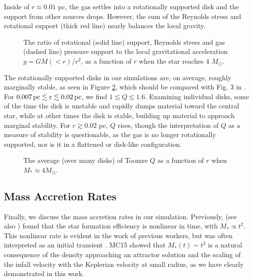 \documentclass[../dissertation.tex]{subfiles}
\begin{document}
Inside of $r\approx 0.01$ pc, the gas settles into a rotationally supported 
disk and the support from other sources drops. However,  
the sum of the Reynolds stress and rotational support (thick red line) nearly balances 
the local gravity. 

\begin{figure}[htb]%
\caption[Hydro Ratio of Pressure and Gravity]{The ratio of rotational (solid line) support, Reynolds stress and gas 
(dashed line) pressure support to the local gravitational acceleration 
$g = GM(<r)/r^2$, as a function of $r$ when the star reaches 4 
$M_{\odot}$. \label{fig:hydro_dPdr_avg}}
\end{figure}

The rotationally supported disks in our simulations are, on average, 
roughly marginally stable,  
as seen in Figure \ref{fig:hydro_Q_avg}, which should be compared with Fig. 3 in \citet{2010ApJ...708.1585K}.  For $0.007\,\rm pc\lesssim r \lesssim 0.02\,\rm pc$, 
we find  $1\lesssim Q\lesssim 1.6$. Examining individual disks, some of 
the time the disk is unstable and rapidly dumps material toward the central 
star, while at other times the disk is stable, building up material to approach marginal stability. For $r\gtrsim 0.02$ pc,  $Q$  rises, though the interpretation of 
$Q$ as a measure of stability is questionable, as the gas is no longer 
rotationally supported, nor is it in a flattened or disk-like configuration. 

\begin{figure}[htb]%
\caption[Hydro Toomre Q average]{The average (over many disks) of Toomre $Q$ as a function of $r$ when  $M_*\approx 4M_{\odot}$. \label{fig:hydro_Q_avg}}
\end{figure}


\subsection{Mass Accretion Rates}

Finally, we discuss the mass accretion rates in our simulation.  Previously,
\citet{2015ApJ...800...49L} (see also \citealt{2014MNRAS.439.3420M}) found 
that the star formation efficiency is nonlinear in time, with $M_* \propto t^2$.  
This nonlinear rate is evident in the work of previous workers, but was 
often interpreted as an initial transient \citep{2011ApJ...730...40P}.  MC15 
showed that $M_*(t)\sim t^2$  is a natural consequence of the density approaching an 
attractor solution and the scaling of the infall velocity with the Keplerian 
velocity at small radius, as we have clearly demonstrated in this work.  
\end{document}
